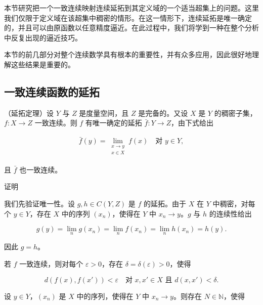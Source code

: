 本节研究把一个一致连续映射连续延拓到其定义域的一个适当超集上的问题。这里我们仅限于定义域在该超集中稠密的情形。在这一情形下，连续延拓是唯一确定的，并且可以由原函数以任意精度逼近。在此过程中，我们将学到一种在整个分析中反复出现的逼近技巧。

本节的前几部分对整个连续数学具有根本的重要性，并有众多应用，因此很好地理解这些结果是重要的。

\subsection*{一致连续函数的延拓}

\begin{theorem}

（延拓定理）设 $ Y $ 与 $ Z $ 是度量空间，且 $ Z $ 是完备的。又设 $ X $ 是 $ Y $ 的稠密子集，$ f : X \to Z $ 一致连续。则 $ f $ 有唯一确定的延拓 $ \bar{f} : Y \to Z $，由下式给出

\begin{equation*}
\begin{aligned}
\bar{f}(y) = \lim_{\substack{x \to y \\ x \in X}} f(x) \quad \text{对 } y \in Y,
\end{aligned}
\end{equation*}

且 $ \bar{f} $ 也一致连续。

证明

\begin{subitems}
\item

我们先验证唯一性。设 $ g, h \in C(Y, Z) $ 是 $ f $ 的延拓。由于 $ X $ 在 $ Y $ 中稠密，对每个 $ y \in Y $，存在 $ X $ 中的序列 $ (x_n) $，使得在 $ Y $ 中 $ x_n \to y $。$ g $ 与 $ h $ 的连续性给出

\[
g(y) = \lim_n g(x_n) = \lim_n f(x_n) = \lim_n h(x_n) = h(y).
\]

因此 $ g = h $。

\item

若 $ f $ 一致连续，则对每个 $ \varepsilon > 0 $，存在 $ \delta = \delta(\varepsilon) > 0 $，使得

\begin{equation}
d(f(x), f(x')) < \varepsilon \quad \text{对 } x, x' \in X \text{ 且 } d(x, x') < \delta.\tag{2.1}
\end{equation}

设 $ y \in Y $，$ (x_n) $ 是 $ X $ 中的序列，使得在 $ Y $ 中 $ x_n \to y $。则存在 $ N \in \mathbb{N} $，使得


\end{subitems}
\end{theorem}
